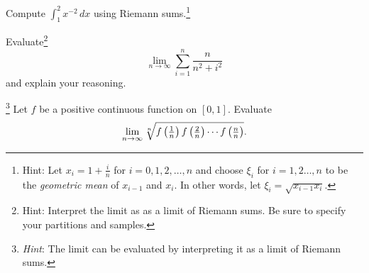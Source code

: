 \documentclass{../homework}
\date{Thursday 3/14}
\author{}
\begin{document}
\begin{Exercise}
	Compute $\displaystyle \int_1^2 x^{-2}\,dx$ using Riemann
  sums.\footnote{Hint: Let $x_i = 1 + \frac{i}{n}$ for
    $i = 0,1,2,\ldots,n$ and choose $\xi_i$ for $i = 1,2\ldots, n$ to
    be the \emph{geometric mean} of $x_{i-1}$ and $x_i$.  In other
    words, let $\xi_i = \sqrt{x_{i-1}x_i}$.}

  \begin{solution}

  \end{solution}
\end{Exercise}

\begin{Exercise}
	Evaluate\footnote{Hint: Interpret the limit as as a limit of Riemann
    sums.  Be sure to specify your partitions and samples.}
	\begin{equation*}
		\lim_{n\to\infty} \sum_{i=1}^n \frac{n}{n^2 + i^2}
	\end{equation*}
	and explain your reasoning.

  \begin{solution}

  \end{solution}
\end{Exercise}

\begin{Exercise}
  \footnote{\emph{Hint}: The limit can be evaluated by interpreting it
    as a limit of Riemann sums.}  Let $f$ be a positive continuous
  function on $[0,1]$.  Evaluate
  \[
		\lim_{n \to \infty} \sqrt[n]{
      f\left( {\tfrac{1}{n}} \right)
      f\left( {\tfrac{2}{n}} \right) \cdots
      f\left( {\tfrac{n}{n}} \right)
    }.
  \]

  \begin{solution}

  \end{solution}
\end{Exercise}
\end{document}
